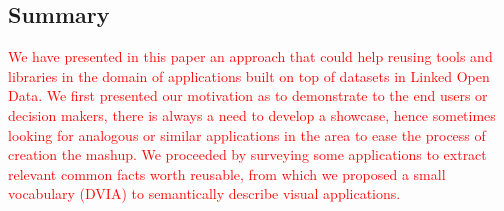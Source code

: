 \begin{figure}[!htbp]
\vspace{-2.5cm}
\end{figure}



\subsection*{Summary} \label{sec:conclusion}
\textcolor{red}{We have presented in this paper an approach that could help reusing tools and libraries in the domain of applications built on top of datasets in Linked Open Data. We first presented our motivation as to demonstrate to the end users or decision makers, there is always a need to develop a showcase, hence sometimes looking for analogous or similar applications in the area to ease the process of creation the mashup. We proceeded by surveying some applications to extract relevant common facts worth reusable, from which we proposed a small vocabulary (DVIA)  to semantically describe visual applications. }

